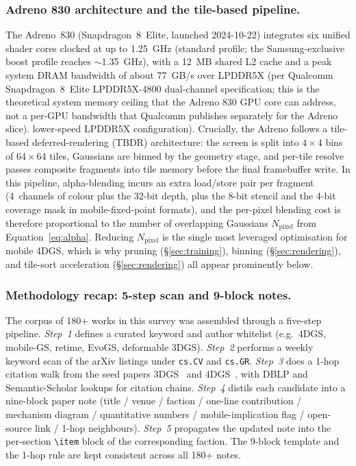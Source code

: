 \subsubsection{Adreno 830 architecture and the tile-based pipeline.}
The Adreno~830 (Snapdragon~8~Elite, launched 2024-10-22) integrates
six unified shader cores clocked at up to 1.25~GHz
(standard profile; the Samsung-exclusive boost profile reaches
$\sim$1.35~GHz), with a 12~MB shared L2 cache and
a peak system DRAM bandwidth of about 77~GB/s over LPDDR5X
(per Qualcomm Snapdragon~8~Elite LPDDR5X-4800 dual-channel
specification; this is the theoretical system memory ceiling
that the Adreno 830 GPU core can address, not a per-GPU
bandwidth that Qualcomm publishes separately for the Adreno
slice).
lower-speed LPDDR5X configuration). Crucially, the Adreno
follows a tile-based deferred-rendering (TBDR) architecture:
the screen is split into
$4\!\times\!4$ bins of $64\!\times\!64$ tiles, Gaussians are
binned by the geometry stage, and per-tile resolve passes composite
fragments into tile memory before the final framebuffer write. In
this pipeline, alpha-blending incurs an extra load/store pair per
fragment (4~channels of colour plus the 32-bit depth, plus the
8-bit stencil and the 4-bit coverage mask in mobile-fixed-point
formats), and the per-pixel blending cost is therefore
proportional to the number of overlapping Gaussians $N_{\text{pixel}}$
from Equation~\eqref{eq:alpha}. Reducing $N_{\text{pixel}}$ is the
single most leveraged optimisation for mobile 4DGS, which is why
pruning (\S\ref{sec:training}), binning (\S\ref{sec:rendering}),
and tile-sort acceleration (\S\ref{sec:rendering}) all appear
prominently below.

\subsubsection{Methodology recap: 5-step scan and 9-block notes.}
The corpus of 180+ works in this survey was assembled through a
five-step pipeline. \emph{Step~1} defines a curated keyword
and author whitelist (e.g.\ 4DGS, mobile-GS, retime, EvoGS,
deformable 3DGS). \emph{Step~2} performs a weekly keyword scan
of the arXiv listings under \texttt{cs.CV} and \texttt{cs.GR}.
\emph{Step~3} does a 1-hop citation walk from the seed papers
3DGS~\cite{kerbl20233dgs} and 4DGS~\cite{wu20244dgs}, with DBLP
and Semantic-Scholar lookups for citation chains. \emph{Step~4}
distils each candidate into a nine-block paper note (title /
venue / faction / one-line contribution / mechanism diagram /
quantitative numbers / mobile-implication flag / open-source
link / 1-hop neighbours). \emph{Step~5} propagates the updated
note into the per-section \verb|\item| block of the
corresponding faction. The 9-block template and the 1-hop rule
are kept consistent across all 180+ notes.

